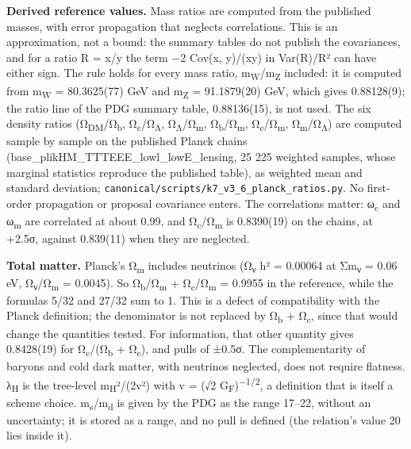 \documentclass[11pt,a4paper]{article}
\begin{document}
\textbf{Derived reference values.} Mass ratios are computed from the published masses, with error propagation that neglects correlations. This is an approximation, not a bound: the summary tables do not publish the covariances, and for a ratio R = x/y the term −2 Cov(x, y)/(xy) in Var(R)/R² can have either sign. The rule holds for every mass ratio, m\textsubscript{W}/m\textsubscript{Z} included: it is computed from m\textsubscript{W} = 80.3625(77) GeV and m\textsubscript{Z} = 91.1879(20) GeV, which gives 0.88128(9); the ratio line of the PDG summary table, 0.88136(15), is not used. The six density ratios (Ω\textsubscript{DM}/Ω\textsubscript{b}, Ω\textsubscript{c}/Ω\textsubscript{Λ}, Ω\textsubscript{Λ}/Ω\textsubscript{m}, Ω\textsubscript{b}/Ω\textsubscript{m}, Ω\textsubscript{c}/Ω\textsubscript{m}, Ω\textsubscript{m}/Ω\textsubscript{Λ}) are computed sample by sample on the published Planck chains \cite{3} (base\_\allowbreak{}plikHM\_\allowbreak{}TTTEEE\_\allowbreak{}lowl\_\allowbreak{}lowE\_\allowbreak{}lensing, 25 225 weighted samples, whose marginal statistics reproduce the published table), as weighted mean and standard deviation; \texttt{canonical/\allowbreak{}scripts/\allowbreak{}k7\_\allowbreak{}v3\_\allowbreak{}6\_\allowbreak{}planck\_\allowbreak{}ratios.\allowbreak{}py}. No first-order propagation or proposal covariance enters. The correlations matter: ω\textsubscript{c} and ω\textsubscript{m} are correlated at about 0.99, and Ω\textsubscript{c}/Ω\textsubscript{m} is 0.8390(19) on the chains, at +2.5σ, against 0.839(11) when they are neglected.

\textbf{Total matter.} Planck's Ω\textsubscript{m} includes neutrinos (Ω\textsubscript{ν} h² = 0.00064 at Σm\textsubscript{ν} = 0.06 eV, Ω\textsubscript{ν}/Ω\textsubscript{m} = 0.0045). So Ω\textsubscript{b}/Ω\textsubscript{m} + Ω\textsubscript{c}/Ω\textsubscript{m} = 0.9955 in the reference, while the formulas 5/32 and 27/32 sum to 1. This is a defect of compatibility with the Planck definition; the denominator is not replaced by Ω\textsubscript{b} + Ω\textsubscript{c}, since that would change the quantities tested. For information, that other quantity gives 0.8428(19) for Ω\textsubscript{c}/(Ω\textsubscript{b} + Ω\textsubscript{c}), and pulls of ±0.5σ. The complementarity of baryons and cold dark matter, with neutrinos neglected, does not require flatness. λ\textsubscript{H} is the tree-level m\textsubscript{H}²/(2v²) with v = (√2 G\textsubscript{F})\textsuperscript{−1/2}, a definition that is itself a scheme choice. m\textsubscript{s}/m\textsubscript{d} is given by the PDG as the range 17--22, without an uncertainty; it is stored as a range, and no pull is defined (the relation's value 20 lies inside it).
\end{document}
